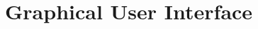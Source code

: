 \documentclass[11pt,fleqn]{book} %
\begin{document}

\chapter{Graphical User Interface}



\end{document}
